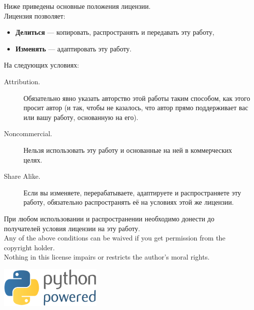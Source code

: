 \noindent
Ниже приведены основные положения лицензии.\\

\noindent
Лицензия позволяет:
\begin{itemize}
 \item \textbf{Делиться} — копировать, распространять и передавать эту работу,
 \item \textbf{Изменять} — адаптировать эту работу.
\end{itemize}
\noindent
На следующих условиях:
\begin{description}
 \item[Attribution.] Обязательно явно указать авторство этой работы таким способом, как этого просит автор (и так, чтобы не казалось, что автор прямо поддерживает вас или вашу работу, основанную на его).
 \item[Noncommercial.] Нельзя использовать эту работу и основанные на ней в коммерческих целях.
 \item[Share Alike.] Если вы изменяете, перерабатываете, адаптируете и распространяете эту работу, обязательно распространять её на условиях этой же лицензии.
\end{description}

\noindent
При любом использовании и распространении необходимо донести до получателей условия лицензии на эту работу.\\

\noindent
Any of the above conditions can be waived if you get permission from the copyright holder.\\

\noindent
Nothing in this license impairs or restricts the author's moral rights.\\

\vspace*{4cm}
\begin{center}
\includegraphics[width=5cm]{../en/python-powered.eps}
\end{center}

\mainmatter

\pagestyle{plain}

\tableofcontents
